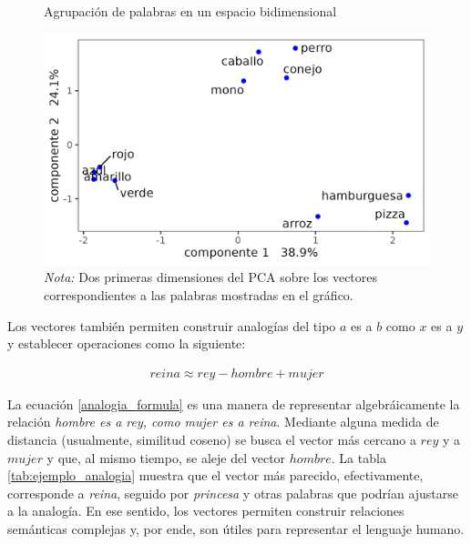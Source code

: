 \documentclass[
  12pt,
]{article}
\begin{document}
\begin{figure}[H]
\centering
\large
\caption{Agrupación de palabras en un espacio bidimensional}
\label{plot_pca_ejemplo}
\includegraphics[width = 0.5 \textwidth]{cuadros_tesis/plot_pca.png}
 \caption*{\footnotesize{\textit{Nota:} Dos primeras dimensiones del PCA sobre los vectores correspondientes a las palabras mostradas en el gráfico.}}

\normalsize
\end{figure}

Los vectores también permiten construir analogías del tipo \(a\) es a
\(b\) como \(x\) es a \(y\) y establecer operaciones como la siguiente:

\begin{align}
\label{analogia_formula}
reina \approx rey - hombre + mujer
\end{align}

La ecuación \ref{analogia_formula} es una manera de representar
algebráicamente la relación
\textit{hombre es a rey, como mujer es a reina}. Mediante alguna medida
de distancia (usualmente, similitud coseno) se busca el vector más
cercano a \(rey\) y a \(mujer\) y que, al mismo tiempo, se aleje del
vector \(hombre\). La tabla \ref{tab:ejemplo_analogia} muestra que el
vector más parecido, efectivamente, corresponde a \emph{reina}, seguido
por \emph{princesa} y otras palabras que podrían ajustarse a la
analogía. En ese sentido, los vectores permiten construir relaciones
semánticas complejas y, por ende, son útiles para representar el
lenguaje humano.
\end{document}
